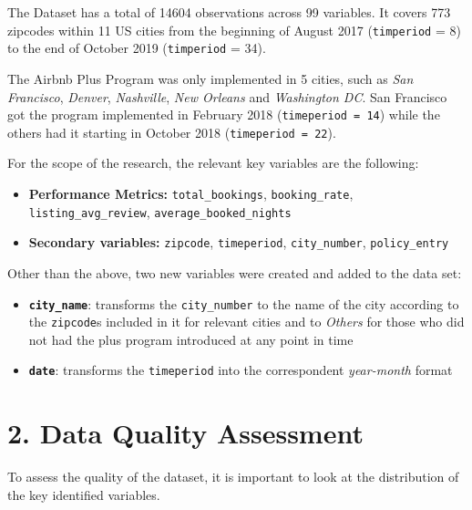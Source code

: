\documentclass[
  12pt,
]{article}
\providecommand{\tightlist}{%
  \setlength{\itemsep}{0pt}\setlength{\parskip}{0pt}}
\begin{document}
The Dataset has a total of 14604 observations across 99 variables. It
covers 773 zipcodes within 11 US cities from the beginning of August
2017 (\texttt{timperiod} = 8) to the end of October 2019
(\texttt{timperiod} = 34).

The Airbnb Plus Program was only implemented in 5 cities, such as
\emph{San Francisco}, \emph{Denver}, \emph{Nashville}, \emph{New
Orleans} and \emph{Washington DC}. San Francisco got the program
implemented in February 2018 (\texttt{timeperiod\ =\ 14}) while the
others had it starting in October 2018 (\texttt{timeperiod\ =\ 22}).

For the scope of the research, the relevant key variables are the
following:

\begin{itemize}
\tightlist
\item
  \textbf{Performance Metrics:} \texttt{total\_bookings},
  \texttt{booking\_rate}, \texttt{listing\_avg\_review},
  \texttt{average\_booked\_nights}
\item
  \textbf{Secondary variables:} \texttt{zipcode}, \texttt{timeperiod},
  \texttt{city\_number}, \texttt{policy\_entry}
\end{itemize}

Other than the above, two new variables were created and added to the
data set:

\begin{itemize}
\tightlist
\item
  \textbf{\texttt{city\_name}}: transforms the \texttt{city\_number} to
  the name of the city according to the \texttt{zipcode}s included in it
  for relevant cities and to \emph{Others} for those who did not had the
  plus program introduced at any point in time
\item
  \textbf{\texttt{date}}: transforms the \texttt{timeperiod} into the
  correspondent \emph{year-month} format
\end{itemize}

\newpage

\section{2. Data Quality Assessment}\label{data-quality-assessment}

To assess the quality of the dataset, it is important to look at the
distribution of the key identified variables.
\end{document}
